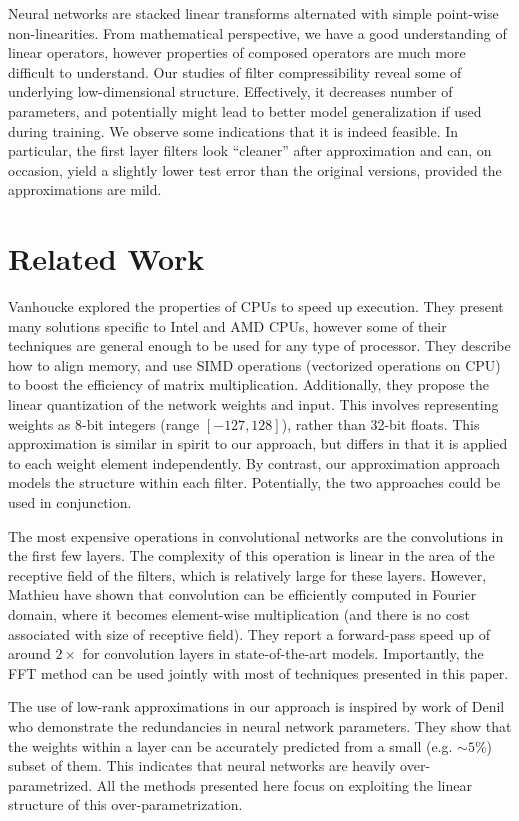 Neural networks are stacked linear transforms alternated with simple
point-wise non-linearities. From mathematical perspective, we have a good understanding
of linear operators, however properties of composed operators are much more
difficult to understand. Our studies of filter compressibility reveal some of underlying
low-dimensional structure. Effectively, it decreases number of parameters, and
potentially might lead to better model generalization if used during training.
We observe some indications that it is indeed feasible. In particular,
the first layer filters look ``cleaner'' after approximation and can,
on occasion, yield a slightly lower test error than the original versions,
provided the approximations are mild. 

\section{Related Work}

Vanhoucke \etal \cite{vanhoucke2011improving} explored the
properties of CPUs to speed up execution.  They present many solutions
specific to Intel and AMD CPUs, however some of their techniques are
general enough to be used for any type of processor.  They describe
how to align memory, and use SIMD operations (vectorized operations on
CPU) to boost the efficiency of matrix multiplication.  Additionally, they
propose the linear quantization of the network weights and input. This
involves representing weights as 8-bit integers (range
$[-127, 128]$), rather than 32-bit floats. This approximation is
similar in spirit to our approach, but differs in that it is applied
to each weight element independently. By contrast, our approximation approach models
the structure within each filter. Potentially, the two approaches
could be used in conjunction. 


The most expensive operations in convolutional networks are the
convolutions in the first few layers. The complexity of this operation
is linear in the area of the receptive field of the filters, which is
relatively large for these layers.  However, Mathieu \etal \cite{mathieu2013fast} have shown that convolution can be
efficiently computed in Fourier domain, where it becomes element-wise
multiplication (and there is no cost associated with size of receptive
field). They report a forward-pass speed up of around $2\times$ for
convolution layers in state-of-the-art models. Importantly, the FFT method can
be used jointly with most of techniques presented in this paper.

The use of low-rank approximations in our approach is inspired by work
of Denil \etal \cite{denil2013predicting} who demonstrate the redundancies in neural
network parameters. They show that the weights within a layer can be
accurately predicted from a small (e.g. $\sim 5\%$) subset of them. This
indicates that neural networks are heavily over-parametrized.  All the
methods presented here focus on exploiting the linear structure of this
over-parametrization.
